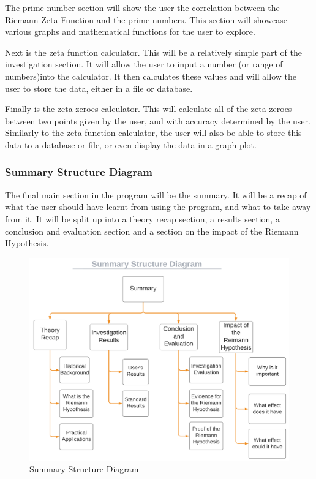 \documentclass[12pt]{article}
\begin{document}
The prime number section will show the user the correlation between the Riemann Zeta Function and the prime numbers. This section will showcase various graphs and mathematical functions for the user to explore.

Next is the zeta function calculator. This will be a relatively simple part of the investigation section. It will allow the user to input a number (or range of numbers)into the calculator. It then calculates these values and will allow the user to store the data, either in a file or database.

Finally is the zeta zeroes calculator. This will calculate all of the zeta zeroes between two points given by the user, and with accuracy determined by the user. Similarly to the zeta function calculator, the user will also be able to store this data to a database or file, or even display the data in a graph plot.


\subsubsection{Summary Structure Diagram}

The final main section in the program will be the summary. It will be a recap of what the user should have learnt from using the program, and what to take away from it. It will be split up into a theory recap section, a results section, a conclusion and evaluation section and a section on the impact of the Riemann Hypothesis.


\begin{figure}[h]
    \centering
    \captionsetup{justification=centering}
    \includegraphics[scale=0.5]{summary-structure-diagram}
    \caption{Summary Structure Diagram}
\end{figure}
\end{document}
